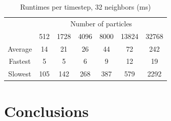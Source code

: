 \documentclass[cameraready]{acmsiggraph-awb}
\begin{document}
\begin{table}[htdp]
\caption{Runtimes per timestep, 32 neighbors (ms)}
\begin{center}
\begin{tabular}{ccccccc}
& \multicolumn{6}{c}{Number of particles} \\
& 512 & 1728 & 4096 & 8000 & 13824 & 32768 \\ \hline
Average &14	&21	&26	&44	&72	&242 \\
Fastest & 5&	5&	6	&9	&12	&19 \\
Slowest & 105&	142	&268	&387	&579&	2292\\
\end{tabular}
\end{center}
\label{tab:scaling2}
\end{table}%

\section{Conclusions}


%
%
%
%












\end{document}
